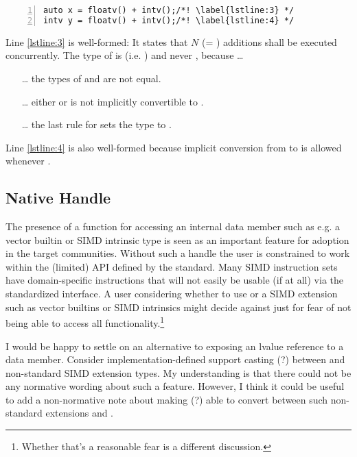 \begin{enumerate}
\begin{lstlisting}[style=Vc,numbers=left]
auto x = floatv() + intv();/*! \label{lstline:3} */
intv y = floatv() + intv();/*! \label{lstline:4} */
\end{lstlisting}
    Line \ref{lstline:3} is well-formed:
    It states that $N$ (= ) additions shall be executed concurrently.
    The type of  is  (i.e. ) and never \simd[<\float{}>], because \ldots
    \begin{enumerate}
      \item[\ldots] the  types of  and  are not equal.
      \item[\ldots] either  or  is not implicitly convertible to \simd[<\float{}>].
      \item[\ldots] the last rule for  sets the  type to .
    \end{enumerate}
    Line \ref{lstline:4} is also well-formed because implicit conversion from  to  is allowed whenever .
\end{enumerate}


\subsection{Native Handle}\label{sec:native}
The presence of a  function for accessing an internal data member such as e.g. a vector builtin or SIMD intrinsic type is seen as an important feature for adoption in the target communities.
Without such a handle the user is constrained to work within the (limited) API defined by the standard.
Many SIMD instruction sets have domain-specific instructions that will not easily be usable (if at all) via the standardized interface.
A user considering whether to use \simd or a SIMD extension such as vector builtins or SIMD intrinsics might decide against \simd just for fear of not being able to access all functionality.\footnote{
  Whether that's a reasonable fear is a different discussion.
}

I would be happy to settle on an alternative to exposing an lvalue reference to a data member.
Consider implementation-defined support casting (?) between \simd and non-standard SIMD extension types.
My understanding is that there could not be any normative wording about such a feature.
However, I think it could be useful to add a non-normative note about making (?) able to convert between such non-standard extensions and \simd.

